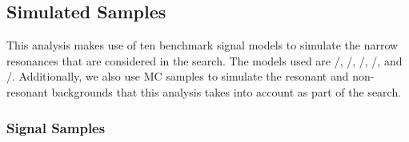 %  
%
%  


\subsection{Simulated Samples}
\label{sec:simSamples}

This analysis makes use of ten benchmark signal models to simulate the narrow resonances that are considered in the search.
The models used are \ggF/\VBF\GBulktoWWtolnuqqbarpr, \ggF/\VBF\RadtoWWtolnuqqbarpr, \DY/\VBF\WprtoWZtolnuqqbar, \DY/\VBF\WprtoWHtolnubbbar, and \DY/\VBF\ZprtoWWtolnuqqbarpr.
Additionally, we also use MC samples to simulate the resonant and non-resonant backgrounds that this analysis takes into account as part of the search.

\subsubsection{Signal Samples}

